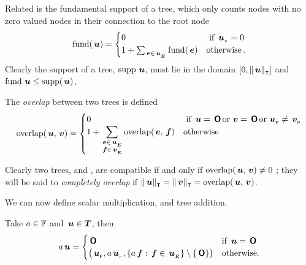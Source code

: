 Related is the fundamental support of a tree, which only counts nodes
with no zero valued nodes in their connection to the root node
  \begin{align*}
    \fund(\node{u}) = \begin{cases}
      0 & \text{ if } \nv{u} = 0 \\
      1 + \sum_{\node{e}\in\extn{u}} \fund(\node{e}) & \otherwise.
    \end{cases}
  \end{align*}
  Clearly the support of a tree, $\supp{\node{u}}$,  must lie in the
  domain $[0,\Tcard{\node{u}}]$ and $\fund{\node{u}} \le \supp(\node{u})$.


The \emph{overlap} between two trees is defined
  \begin{align*}
    \overlap(\node{u},\node{v}) = \begin{cases}
      0 & \text{ if } \node{u} = \nulltree \mor \node{v} = \nulltree \mor \nlabel{u} \neq \nlabel{v} \\
      1 + \displaystyle\sum_{\substack{\node{e}\in\extn{u} \\ \node{f}\in\extn{v}}} \overlap(\node{e},\node{f}) & \text{otherwise}
    \end{cases}
  \end{align*}

  Clearly two trees,  and , are compatible if and only if \(\overlap(\node{u},\node{v}) \neq 0 \) ; they will
  be said to \emph{completely overlap} if \(\Tcard{\node{u}} = \Tcard{\node{v}} =
  \overlap(\node{u},\node{v})\).



We can now define scalar multiplication, and tree addition.
\begin{definition}
  \label{defscalar*}
  Take $a \in \FIELD$ and $\node{u} \in \DOM$, then
  \begin{equation}
    a\node{u} = \begin{cases}
      \nulltree & \text{if } \node{u} = \nulltree \\      
      \bigl(\nlabel{u}, a\nv{u}, \{a\node{f}: \node{f} \in \extn{u}\}\setminus\{\nulltree\}\bigr) & \text{otherwise.}
    \end{cases}
  \end{equation}
\end{definition}




